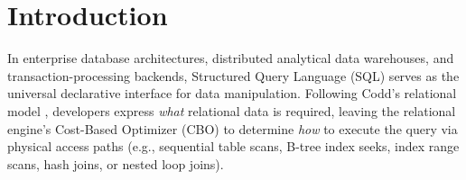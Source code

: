 \documentclass[conference]{IEEEtran}
\begin{document}
\section{Introduction}

In enterprise database architectures, distributed analytical data warehouses, and transaction-processing backends, Structured Query Language (SQL) serves as the universal declarative interface for data manipulation. Following Codd's relational model \cite{codd1970relational}, developers express \textit{what} relational data is required, leaving the relational engine's Cost-Based Optimizer (CBO) \cite{selinger1979access, graefe1993query} to determine \textit{how} to execute the query via physical access paths (e.g., sequential table scans, B-tree index seeks, index range scans, hash joins, or nested loop joins).
\end{document}
